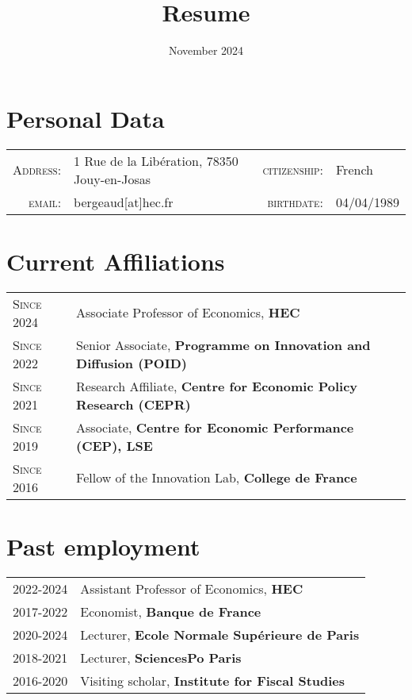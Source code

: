 \documentclass[12pt]{article}
\begin{document}
\title{\textbf{Resume}}
\date{November 2024}
\maketitle
\section*{Personal Data}

\begin{tabular}{r l r l }
    \textsc{Address:}   & 1 Rue de la Libération, 78350 Jouy-en-Josas  & \textsc{citizenship:} & French \\
    \textsc{email:}     & bergeaud[at]hec.fr &     \textsc{birthdate:} & 04/04/1989 \\ 
\end{tabular}

\section*{Current Affiliations}
\begin{tabular}{p{3cm}l}

\textsc{Since 2024} & Associate Professor of Economics, \textbf{HEC} \\
\textsc{Since 2022} & Senior Associate, \textbf{Programme on Innovation and Diffusion 
 (POID)} \\
\textsc{Since 2021} & Research Affiliate, \textbf{Centre for Economic Policy Research (CEPR)} \\
\textsc{Since 2019} & Associate, \textbf{Centre for Economic Performance (CEP), LSE} \\
\textsc{Since 2016} & Fellow of the Innovation Lab, \textbf{College de France} \\
\end{tabular}

\section*{Past employment}

\begin{tabular}{p{3cm}l}
\textsc{2022-2024} & Assistant Professor of Economics, \textbf{HEC} \\
\textsc{2017-2022} & Economist, \textbf{Banque de France} \\
\textsc{2020-2024} & Lecturer, \textbf{Ecole Normale Supérieure de Paris} \\
\textsc{2018-2021} & Lecturer, \textbf{SciencesPo Paris} \\
\textsc{2016-2020} & Visiting scholar, \textbf{Institute for Fiscal Studies}
\end{tabular}
\end{document}
